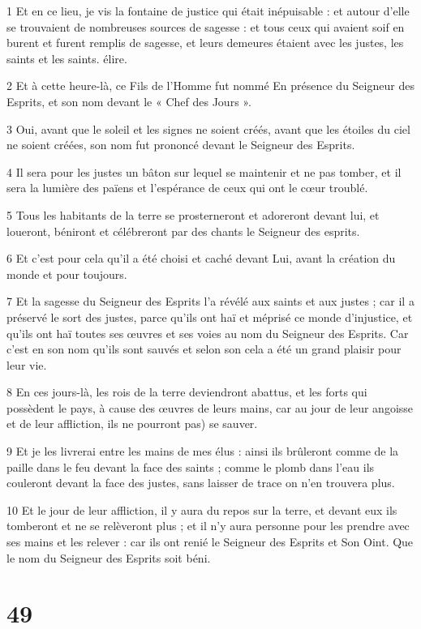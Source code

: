 \par 1 Et en ce lieu, je vis la fontaine de justice qui était inépuisable : et autour d'elle se trouvaient de nombreuses sources de sagesse : et tous ceux qui avaient soif en burent et furent remplis de sagesse, et leurs demeures étaient avec les justes, les saints et les saints. élire.
\par 2 Et à cette heure-là, ce Fils de l'Homme fut nommé En présence du Seigneur des Esprits, et son nom devant le « Chef des Jours ».
\par 3 Oui, avant que le soleil et les signes ne soient créés, avant que les étoiles du ciel ne soient créées, son nom fut prononcé devant le Seigneur des Esprits.
\par 4 Il sera pour les justes un bâton sur lequel se maintenir et ne pas tomber, et il sera la lumière des païens et l'espérance de ceux qui ont le cœur troublé.
\par 5 Tous les habitants de la terre se prosterneront et adoreront devant lui, et loueront, béniront et célébreront par des chants le Seigneur des esprits.
\par 6 Et c'est pour cela qu'il a été choisi et caché devant Lui, avant la création du monde et pour toujours.
\par 7 Et la sagesse du Seigneur des Esprits l'a révélé aux saints et aux justes ; car il a préservé le sort des justes, parce qu'ils ont haï et méprisé ce monde d'injustice, et qu'ils ont haï toutes ses œuvres et ses voies au nom du Seigneur des Esprits. Car c'est en son nom qu'ils sont sauvés et selon son cela a été un grand plaisir pour leur vie.
\par 8 En ces jours-là, les rois de la terre deviendront abattus, et les forts qui possèdent le pays, à cause des œuvres de leurs mains, car au jour de leur angoisse et de leur affliction, ils ne pourront pas) se sauver.
\par 9 Et je les livrerai entre les mains de mes élus : ainsi ils brûleront comme de la paille dans le feu devant la face des saints ; comme le plomb dans l'eau ils couleront devant la face des justes, sans laisser de trace on n’en trouvera plus.
\par 10 Et le jour de leur affliction, il y aura du repos sur la terre, et devant eux ils tomberont et ne se relèveront plus ; et il n'y aura personne pour les prendre avec ses mains et les relever : car ils ont renié le Seigneur des Esprits et Son Oint. Que le nom du Seigneur des Esprits soit béni.

\chapter{49}

